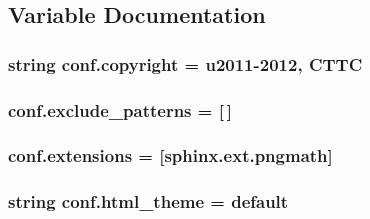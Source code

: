 \subsection{Variable Documentation}
\subsubsection[{\texorpdfstring{copyright}{copyright}}]{\setlength{\rightskip}{0pt plus 5cm}string conf.\+copyright = u\textquotesingle{}2011-\/2012, C\+T\+TC\textquotesingle{}}\hypertarget{namespaceconf_ac8ccf456b321bc9052c0691a173b6925}{}\label{namespaceconf_ac8ccf456b321bc9052c0691a173b6925}
\subsubsection[{\texorpdfstring{exclude\+\_\+patterns}{exclude_patterns}}]{ conf.\+exclude\+\_\+patterns = \mbox{[}$\,$\mbox{]}}\hypertarget{namespaceconf_aa01918cfe75aed3ae059dd96c71c8f08}{}\label{namespaceconf_aa01918cfe75aed3ae059dd96c71c8f08}
\subsubsection[{\texorpdfstring{extensions}{extensions}}]{ conf.\+extensions = \mbox{[}\textquotesingle{}sphinx.\+ext.\+pngmath\textquotesingle{}\mbox{]}}\hypertarget{namespaceconf_a540efa67c53e84c1c353c1df2e37e39c}{}\label{namespaceconf_a540efa67c53e84c1c353c1df2e37e39c}
\subsubsection[{\texorpdfstring{html\+\_\+theme}{html_theme}}]{\setlength{\rightskip}{0pt plus 5cm}string conf.\+html\+\_\+theme = \textquotesingle{}default\textquotesingle{}}\hypertarget{namespaceconf_a7f1b143ff25817758abd21a7db110510}{}\label{namespaceconf_a7f1b143ff25817758abd21a7db110510}
